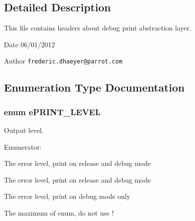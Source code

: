 \subsection{Detailed Description}
This file contains headers about debug print abstraction layer. \begin{DoxyDate}{Date}
06/01/2012 
\end{DoxyDate}
\begin{DoxyAuthor}{Author}
{\tt frederic.dhaeyer@parrot.com} 
\end{DoxyAuthor}


\subsection{Enumeration Type Documentation}
\subsubsection[{ePRINT\_\-LEVEL}]{\setlength{\rightskip}{0pt plus 5cm}enum {\bf ePRINT\_\-LEVEL}}\label{print_8h_acddc3b5b66b0c2a55c86dbab6cdc54a8}


Output level. 

\begin{Desc}
\item[Enumerator: ]\par
\begin{description}
\item[{\em 
PRINT\_\-ERROR\label{print_8h_acddc3b5b66b0c2a55c86dbab6cdc54a8a3a1660cf56c26b930ad198eff12898ce}
}]The error level, print on release and debug mode \item[{\em 
PRINT\_\-WARNING\label{print_8h_acddc3b5b66b0c2a55c86dbab6cdc54a8abee3929de920502d92788a8576c641e2}
}]The error level, print on release and debug mode \item[{\em 
PRINT\_\-DEBUG\label{print_8h_acddc3b5b66b0c2a55c86dbab6cdc54a8aebc36e0d821ffb32ac8e3ce47624954a}
}]The error level, print on debug mode only \item[{\em 
PRINT\_\-MAX\label{print_8h_acddc3b5b66b0c2a55c86dbab6cdc54a8abcfd86e7b5398894417c085111d030a3}
}]The maximum of enum, do not use ! \end{description}
\end{Desc}

